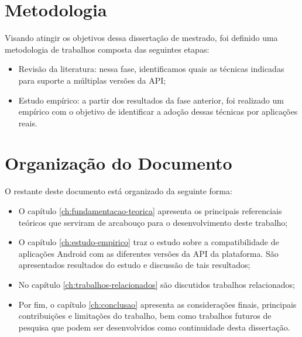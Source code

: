 \section{Metodologia} \label{sec:metodologia}

Visando atingir os objetivos dessa dissertação de mestrado, foi definido uma
metodologia de trabalhos composta das seguintes etapas:
\begin{itemize}
	\item Revisão da literatura: nessa fase, identificamos quais as técnicas
	indicadas para suporte a múltiplas versões da API;
	\item Estudo empírico: a partir dos resultados da fase anterior, foi realizado
	um empírico com o objetivo de identificar a adoção dessas técnicas por aplicações reais.
\end{itemize}


\section{Organização do Documento} \label{sec:organizacao-trabalho}

O restante deste documento está organizado da seguinte forma:
\begin{itemize}
    \item O capítulo \ref{ch:fundamentacao-teorica} apresenta os principais
    referenciais teóricos que serviram de arcabouço para o desenvolvimento  deste trabalho;
    \item O capítulo \ref{ch:estudo-empirico} traz o estudo sobre a compatibilidade
    de aplicações Android com as diferentes versões da API da plataforma. São
    apresentados resultados do estudo e discussão de tais resultados;
    \item No capítulo \ref{ch:trabalhos-relacionados} são discutidos trabalhos
    relacionados;
    \item Por fim, o capítulo \ref{ch:conclusao} apresenta as considerações finais,
    principais contribuições e limitações do trabalho, bem como trabalhos futuros
    de pesquisa que podem ser desenvolvidos como continuidade desta dissertação.
\end{itemize}
